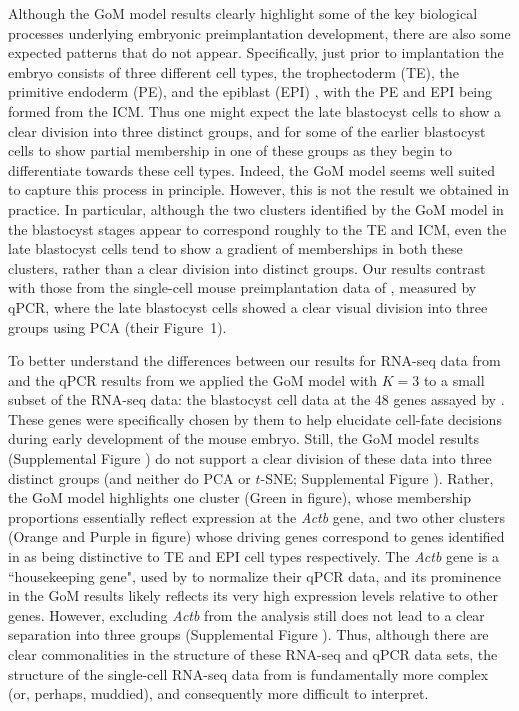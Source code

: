 \documentclass[10pt,letterpaper]{article}
\begin{document}
Although the GoM model results clearly highlight some of the key biological processes underlying embryonic preimplantation development, there are
also some expected patterns that do not appear. Specifically, just prior to implantation the embryo consists of three different cell types,
the trophectoderm (TE), the primitive endoderm (PE), and the
epiblast (EPI) \cite{Rossant2009}, with the PE and EPI being formed from the ICM.
Thus one might expect the late blastocyst cells to show a clear division into three distinct groups, and
for some of the earlier blastocyst cells to show partial membership in one of these groups as they begin to differentiate towards these cell types.
Indeed, the GoM model seems well suited to capture this process in principle. However, this is not the result we obtained in practice.
In particular, although the two clusters identified by the GoM model in the blastocyst stages appear to correspond roughly to the TE and ICM, even the late blastocyst cells tend to show a gradient of memberships in both these clusters, rather than a clear division into distinct groups. Our results contrast with those from the single-cell mouse preimplantation data of \cite{Guo2010}, measured by qPCR, where the late blastocyst cells showed a clear visual division into three groups using PCA (their Figure~1).

To better understand the differences between our results for RNA-seq data from \cite{Deng2014} and the qPCR results from \cite{Guo2010} we applied the GoM model
with $K=3$ to a small subset of the RNA-seq data: the blastocyst cell data at the 48 genes assayed by \cite{Guo2010}. These genes were specifically
chosen by them to help elucidate cell-fate decisions during early development of the mouse embryo. Still, the GoM model results (Supplemental Figure )
do not support a clear division of these data into three distinct
groups (and neither do PCA or $t$-SNE; Supplemental Figure ).
Rather, the GoM model highlights one cluster (Green in figure), whose membership proportions essentially reflect expression at the \textit{Actb} gene,
and two other clusters (Orange and Purple in figure) whose driving genes correspond to genes identified in \cite{Guo2010} as being distinctive to TE and EPI cell types respectively. The \textit{Actb} gene is a ``housekeeping gene", used by \cite{Guo2010} to normalize their qPCR data, and its prominence in the GoM results likely reflects its very high expression levels relative to other genes. However, excluding \textit{Actb}  from the analysis still does not lead to a clear separation into three groups (Supplemental Figure ).
Thus, although there are clear commonalities in the structure of these RNA-seq and qPCR data sets, the structure of the single-cell RNA-seq data  from \cite{Deng2014}  is fundamentally more complex (or, perhaps, muddied), and consequently more difficult to interpret.
\end{document}
